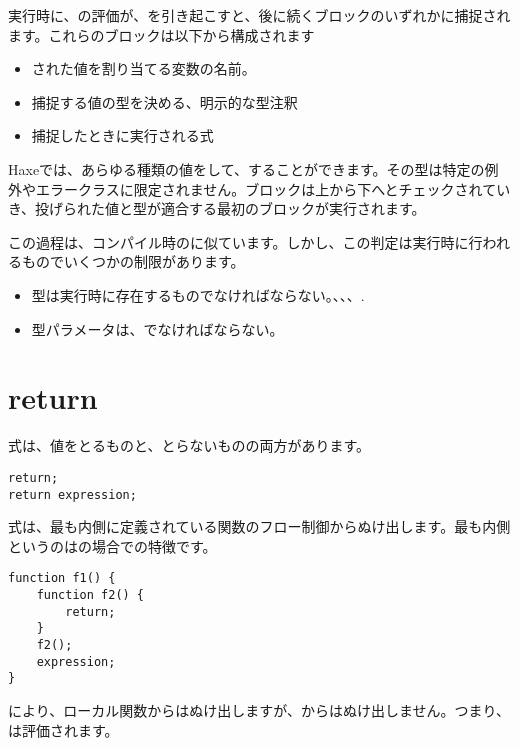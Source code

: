 実行時に、の評価が、を引き起こすと、後に続くブロックのいずれかに捕捉されます。これらのブロックは以下から構成されます

\begin{itemize}
	\item {}された値を割り当てる変数の名前。
	\item 捕捉する値の型を決める、明示的な型注釈
	\item 捕捉したときに実行される式
\end{itemize}

Haxeでは、あらゆる種類の値をして、することができます。その型は特定の例外やエラークラスに限定されません。ブロックは上から下へとチェックされていき、投げられた値と型が適合する最初のブロックが実行されます。

この過程は、コンパイル時のに似ています。しかし、この判定は実行時に行われるものでいくつかの制限があります。

\begin{itemize}
	\item 型は実行時に存在するものでなければならない。、、、.
	\item 型パラメータは、でなければならない。
\end{itemize}

\section{return}
\label{expression-return}

式は、値をとるものと、とらないものの両方があります。

\begin{lstlisting}
return;
return expression;
\end{lstlisting}

式は、最も内側に定義されている関数のフロー制御からぬけ出します。最も内側というのはの場合での特徴です。

\begin{lstlisting}
function f1() {
	function f2() {
		return;
	}
	f2();
	expression;
}
\end{lstlisting}

により、ローカル関数からはぬけ出しますが、からはぬけ出しません。つまり、は評価されます。

